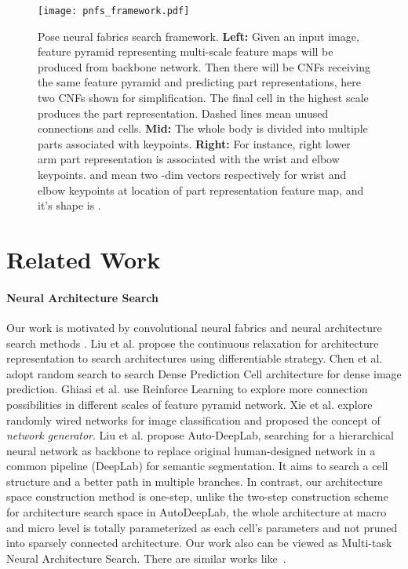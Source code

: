 \documentclass[journal]{IEEEtran}
\begin{document}
\begin{figure*}[h]
	\begin{center}
\texttt{[image: pnfs\_framework.pdf]}
	\end{center}
	\caption{Pose neural fabrics search framework. \textbf{Left:} Given an input image, feature pyramid representing multi-scale feature maps will be produced from backbone network. Then there will be  CNFs receiving the same feature pyramid and predicting  part representations, here two CNFs shown for simplification. The final cell in the highest scale produces the part representation. Dashed lines mean unused connections and cells. \textbf{Mid:} The whole body is divided into multiple parts associated with keypoints.  \textbf{Right:} For instance, right lower arm part representation is associated with the wrist and elbow keypoints.  and  mean two -dim vectors respectively for wrist and elbow keypoints at location  of part representation feature map, and it's shape is .}
	\label{framework}
\end{figure*}


\section{Related Work}

\paragraph{Neural Architecture Search} Our work is motivated by convolutional neural fabrics \cite{saxena2016convolutional} and neural architecture search methods \cite{liu2018darts,chen2018searching,liu2019auto,Xie_2019_ICCV}. Liu et al. \cite{liu2018darts} propose the continuous relaxation for architecture representation to search architectures using differentiable strategy. Chen et al. \cite{chen2018searching} adopt random search to search Dense Prediction Cell architecture for dense image prediction. Ghiasi et al. \cite{Ghiasi_2019_CVPR} use Reinforce Learning to explore more connection possibilities in different scales of feature pyramid network. Xie et al. \cite{Xie_2019_ICCV} explore randomly wired networks for image classification and proposed the concept of \emph{network generator}.  Liu et al. \cite{liu2019auto} propose Auto-DeepLab, searching for a hierarchical neural network as backbone to replace original human-designed network in a common pipeline (DeepLab) for semantic segmentation. It aims to search a cell structure and a better path in multiple branches. In contrast, our architecture space construction method is one-step, unlike the two-step construction scheme for architecture search space in AutoDeepLab, the whole architecture at macro and micro level is totally parameterized as each cell's parameters and not pruned into sparsely connected architecture. Our work also can be viewed as Multi-task Neural Architecture Search. There are similar works like~\cite{liang2018evolutionary, newell2019feature, gao2020mtl}.
\end{document}
